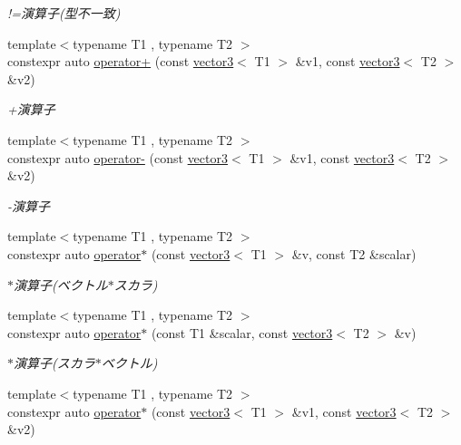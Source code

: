 \begin{DoxyCompactItemize}
\begin{DoxyCompactList}\small\item\em !=演算子(型不一致) \end{DoxyCompactList}\item 
{\footnotesize template$<$typename T1 , typename T2 $>$ }\\constexpr auto \mbox{\hyperlink{namespacesaki_af2eb9872710ab7ebca5e7a665f1a7cd7}{operator+}} (const \mbox{\hyperlink{classsaki_1_1vector3}{vector3}}$<$ T1 $>$ \&v1, const \mbox{\hyperlink{classsaki_1_1vector3}{vector3}}$<$ T2 $>$ \&v2)
\begin{DoxyCompactList}\small\item\em +演算子 \end{DoxyCompactList}\item 
{\footnotesize template$<$typename T1 , typename T2 $>$ }\\constexpr auto \mbox{\hyperlink{namespacesaki_a8697755777c25ac12687ea8804f80331}{operator-\/}} (const \mbox{\hyperlink{classsaki_1_1vector3}{vector3}}$<$ T1 $>$ \&v1, const \mbox{\hyperlink{classsaki_1_1vector3}{vector3}}$<$ T2 $>$ \&v2)
\begin{DoxyCompactList}\small\item\em -\/演算子 \end{DoxyCompactList}\item 
{\footnotesize template$<$typename T1 , typename T2 $>$ }\\constexpr auto \mbox{\hyperlink{namespacesaki_abd9716c5a5ccdc1cafb975df8897acb3}{operator$\ast$}} (const \mbox{\hyperlink{classsaki_1_1vector3}{vector3}}$<$ T1 $>$ \&v, const T2 \&scalar)
\begin{DoxyCompactList}\small\item\em $\ast$演算子(ベクトル$\ast$スカラ) \end{DoxyCompactList}\item 
{\footnotesize template$<$typename T1 , typename T2 $>$ }\\constexpr auto \mbox{\hyperlink{namespacesaki_ab3e41594237dcaac47a2a27ed97f48f6}{operator$\ast$}} (const T1 \&scalar, const \mbox{\hyperlink{classsaki_1_1vector3}{vector3}}$<$ T2 $>$ \&v)
\begin{DoxyCompactList}\small\item\em $\ast$演算子(スカラ$\ast$ベクトル) \end{DoxyCompactList}\item 
{\footnotesize template$<$typename T1 , typename T2 $>$ }\\constexpr auto \mbox{\hyperlink{namespacesaki_a59d261ceb3780fa55acc164671b67992}{operator$\ast$}} (const \mbox{\hyperlink{classsaki_1_1vector3}{vector3}}$<$ T1 $>$ \&v1, const \mbox{\hyperlink{classsaki_1_1vector3}{vector3}}$<$ T2 $>$ \&v2)

\end{DoxyCompactItemize}
